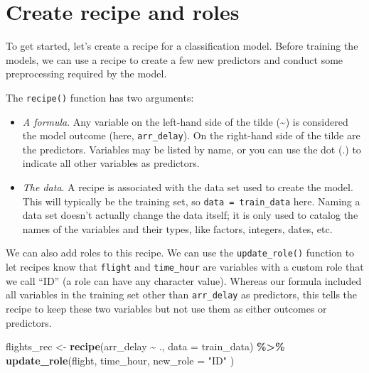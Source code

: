 \documentclass[
]{book}
\newenvironment{Shaded}{\begin{snugshade}}{\end{snugshade}}
\newcommand{\DataTypeTok}[1]{\textcolor[rgb]{0.13,0.29,0.53}{#1}}
\newcommand{\KeywordTok}[1]{\textcolor[rgb]{0.13,0.29,0.53}{\textbf{#1}}}
\newcommand{\NormalTok}[1]{#1}
\newcommand{\OperatorTok}[1]{\textcolor[rgb]{0.81,0.36,0.00}{\textbf{#1}}}
\newcommand{\StringTok}[1]{\textcolor[rgb]{0.31,0.60,0.02}{#1}}
\begin{document}
\hypertarget{create-recipe-and-roles}{%
\chapter{Create recipe and roles}\label{create-recipe-and-roles}}

To get started, let's create a recipe for a classification model. Before training the models, we can use a recipe to create a few new predictors and conduct some preprocessing required by the model.

The \texttt{recipe()} function has two arguments:

\begin{itemize}
\item
  \emph{A formula}. Any variable on the left-hand side of the tilde (\textasciitilde) is considered the model outcome (here, \texttt{arr\_delay}). On the right-hand side of the tilde are the predictors. Variables may be listed by name, or you can use the dot (.) to indicate all other variables as predictors.
\item
  \emph{The data}. A recipe is associated with the data set used to create the model. This will typically be the training set, so \texttt{data\ =\ train\_data} here. Naming a data set doesn't actually change the data itself; it is only used to catalog the names of the variables and their types, like factors, integers, dates, etc.
\end{itemize}

We can also add roles to this recipe. We can use the \texttt{update\_role()} function to let recipes know that \texttt{flight} and \texttt{time\_hour} are variables with a custom role that we call ``ID'' (a role can have any character value). Whereas our formula included all variables in the training set other than \texttt{arr\_delay} as predictors, this tells the recipe to keep these two variables but not use them as either outcomes or predictors.

\begin{Shaded}
\begin{Highlighting}[]
\NormalTok{flights\_rec \textless{}{-}}
\StringTok{  }\KeywordTok{recipe}\NormalTok{(arr\_delay }\OperatorTok{\textasciitilde{}}\StringTok{ }\NormalTok{., }\DataTypeTok{data =}\NormalTok{ train\_data) }\OperatorTok{\%\textgreater{}\%}
\StringTok{  }\KeywordTok{update\_role}\NormalTok{(flight,}
\NormalTok{    time\_hour,}
    \DataTypeTok{new\_role =} \StringTok{"ID"}
\NormalTok{  )}
\end{Highlighting}
\end{Shaded}
\end{document}
